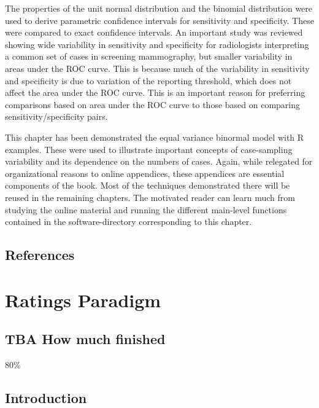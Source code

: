 \documentclass[
]{book}
\begin{document}
The properties of the unit normal distribution and the binomial distribution were used to derive parametric confidence intervals for sensitivity and specificity. These were compared to exact confidence intervals. An important study was reviewed showing wide variability in sensitivity and specificity for radiologists interpreting a common set of cases in screening mammography, but smaller variability in areas under the ROC curve. This is because much of the variability in sensitivity and specificity is due to variation of the reporting threshold, which does not affect the area under the ROC curve. This is an important reason for preferring comparisons based on area under the ROC curve to those based on comparing sensitivity/specificity pairs.

This chapter has been demonstrated the equal variance binormal model with R examples. These were used to illustrate important concepts of case-sampling variability and its dependence on the numbers of cases. Again, while relegated for organizational reasons to online appendices, these appendices are essential components of the book. Most of the techniques demonstrated there will be reused in the remaining chapters. The motivated reader can learn much from studying the online material and running the different main-level functions contained in the software-directory corresponding to this chapter.

\hypertarget{binary-task-model-references}{%
\section{References}\label{binary-task-model-references}}

\hypertarget{ratings-paradigm}{%
\chapter{Ratings Paradigm}\label{ratings-paradigm}}

\hypertarget{ratings-paradigm-how-much-finished}{%
\section{TBA How much finished}\label{ratings-paradigm-how-much-finished}}

80\%

\hypertarget{ratings-paradigm-introduction}{%
\section{Introduction}\label{ratings-paradigm-introduction}}
\end{document}
